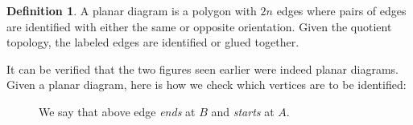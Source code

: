 \documentclass{article}
\theoremstyle{definition}
\newtheorem{defn}[theorem]{Definition}
\begin{document}
%
\begin{defn}
   A planar diagram is a polygon with $2n$ edges where pairs of edges are identified with either the same or opposite orientation. Given the quotient topology, the labeled edges are identified or glued together.
\end{defn}
It can be verified that the two figures seen earlier were indeed planar diagrams.\\
Given a planar diagram, here is how we check which vertices are to be identified:\\
\begin{figure}[h]
  \centering
  \caption{We say that above edge \emph{ends} at $B$ and \emph{starts} at $A.$}
  \label{fig:edge end and start}
\end{figure}
\end{document}
